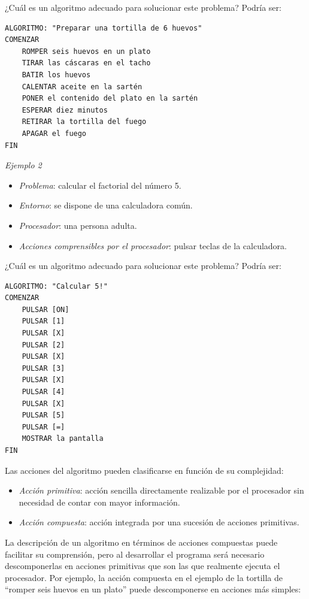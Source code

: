 \documentclass[
]{book}
\providecommand{\tightlist}{%
  \setlength{\itemsep}{0pt}\setlength{\parskip}{0pt}}
\begin{document}
¿Cuál es un algoritmo adecuado para solucionar este problema? Podría ser:

\begin{verbatim}
ALGORITMO: "Preparar una tortilla de 6 huevos"
COMENZAR
    ROMPER seis huevos en un plato
    TIRAR las cáscaras en el tacho
    BATIR los huevos
    CALENTAR aceite en la sartén
    PONER el contenido del plato en la sartén
    ESPERAR diez minutos
    RETIRAR la tortilla del fuego
    APAGAR el fuego
FIN
\end{verbatim}

\emph{Ejemplo 2}

\begin{itemize}
\tightlist
\item
  \emph{Problema}: calcular el factorial del número 5.
\item
  \emph{Entorno}: se dispone de una calculadora común.
\item
  \emph{Procesador}: una persona adulta.
\item
  \emph{Acciones comprensibles por el procesador}: pulsar teclas de la calculadora.
\end{itemize}

¿Cuál es un algoritmo adecuado para solucionar este problema? Podría ser:

\begin{verbatim}
ALGORITMO: "Calcular 5!"
COMENZAR
    PULSAR [ON]
    PULSAR [1]
    PULSAR [X]
    PULSAR [2]
    PULSAR [X]
    PULSAR [3]
    PULSAR [X]
    PULSAR [4]
    PULSAR [X]
    PULSAR [5]
    PULSAR [=]
    MOSTRAR la pantalla
FIN
\end{verbatim}

Las acciones del algoritmo pueden clasificarse en función de su complejidad:

\begin{itemize}
\tightlist
\item
  \emph{Acción primitiva}: acción sencilla directamente realizable por el procesador sin necesidad de contar con mayor información.
\item
  \emph{Acción compuesta}: acción integrada por una sucesión de acciones primitivas.
\end{itemize}

La descripción de un algoritmo en términos de acciones compuestas puede facilitar su comprensión, pero al desarrollar el programa será necesario descomponerlas en acciones primitivas que son las que realmente ejecuta el procesador. Por ejemplo, la acción compuesta en el ejemplo de la tortilla de ``romper seis huevos en un plato'' puede descomponerse en acciones más simples:
\end{document}
